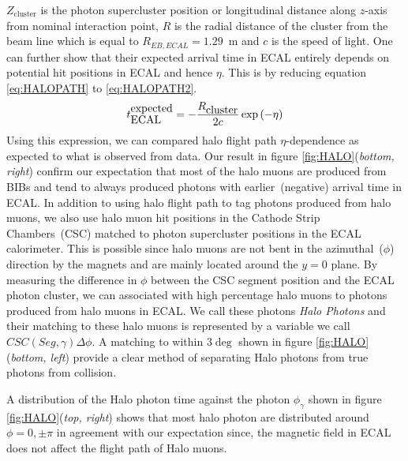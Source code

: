 $Z_{\mbox{cluster}}$ is the photon supercluster position or longitudinal distance along $z$-axis from nominal interaction point, $R$ is the radial distance of the cluster from the beam line which is equal to $R_{EB, ECAL} = 1.29$~m and $c$ is the speed of light.
One can further show that their expected arrival time in ECAL  entirely depends on potential hit positions in ECAL and hence $\eta$. This is by reducing equation \ref{eq:HALOPATH} to \ref{eq:HALOPATH2}.
\begin{equation}{\label{eq:HALOPATH2}}
t^{\mbox{expected}}_{\mbox{ECAL}} = - \frac{R_{\mbox{cluster}}}{2c} \exp{(-\eta)}
\end{equation} 
Using this expression, we can compared halo flight path $\eta$-dependence as expected to what is observed from data. Our result in figure \ref{fig:HALO}(\textit{bottom, right}) confirm our expectation that most of the halo muons are produced from BIBs and tend to always produced photons with earlier~(negative) arrival time in ECAL. 
In addition to using halo flight path to tag photons produced from halo muons, we also use halo muon hit positions in the Cathode Strip Chambers~(CSC) matched to photon supercluster positions in the ECAL calorimeter. This is possible since halo muons are not bent in the azimuthal~($\phi$) direction by the magnets and are mainly located around the $y=0$ plane. By measuring the difference in $\phi$ between the CSC segment position and the ECAL photon cluster, we can associated with high percentage halo muons to photons produced from halo muons in ECAL. We call these photons \textit{Halo Photons} and their matching to these halo muons is represented by a variable we call $CSC(Seg,\gamma)\Delta\phi$. A matching to within $3\deg$ shown in figure \ref{fig:HALO}(\textit{bottom, left}) provide a clear method of separating Halo photons from true photons from collision.

A distribution of the Halo photon time against the photon $\phi_{\gamma}$ shown in figure \ref{fig:HALO}(\textit{top, right}) shows that most halo photon are distributed around $\phi = 0, \pm \pi$ in agreement with our expectation since, the magnetic field in ECAL does not affect the flight path of Halo muons.


